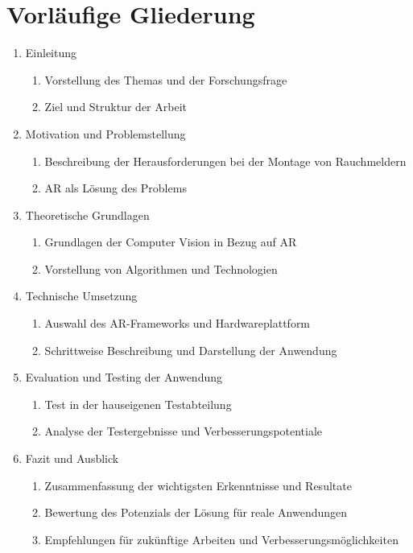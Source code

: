 \section{Vorl\"aufige Gliederung}
\label{sec:structure}

\begin{enumerate}
\item Einleitung
\begin{enumerate}
\item Vorstellung des Themas und der Forschungsfrage
\item Ziel und Struktur der Arbeit
\end{enumerate}
\item Motivation und Problemstellung
\begin{enumerate}
\item Beschreibung der Herausforderungen bei der Montage von Rauchmeldern
\item AR als L\"osung des Problems
\end{enumerate}
\item Theoretische Grundlagen 
\begin{enumerate}
\item Grundlagen der Computer Vision in Bezug auf AR
\item Vorstellung von Algorithmen und Technologien
\end{enumerate}
\item Technische Umsetzung
\begin{enumerate}
\item Auswahl des AR-Frameworks und Hardwareplattform
\item Schrittweise Beschreibung und Darstellung der Anwendung
\end{enumerate}
\item Evaluation und Testing der Anwendung
\begin{enumerate}
\item Test in der hauseigenen Testabteilung
\item Analyse der Testergebnisse und Verbesserungspotentiale
\end{enumerate}
\item Fazit und Ausblick
\begin{enumerate}
\item Zusammenfassung der wichtigsten Erkenntnisse und Resultate
\item Bewertung des Potenzials der L\"osung f\"ur reale Anwendungen
\item Empfehlungen f\"ur zuk\"unftige Arbeiten und Verbesserungsm\"oglichkeiten
\end{enumerate}
\end{enumerate}